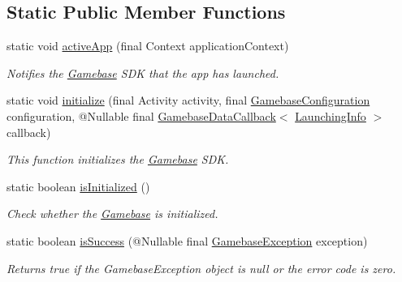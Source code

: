 \subsection*{Static Public Member Functions}
\begin{DoxyCompactItemize}
\item 
static void \hyperlink{classcom_1_1toast_1_1android_1_1gamebase_1_1_gamebase_a07fe4c62c585e8af9f924935e813ff12}{active\+App} (final Context application\+Context)
\begin{DoxyCompactList}\small\item\em Notifies the \hyperlink{classcom_1_1toast_1_1android_1_1gamebase_1_1_gamebase}{Gamebase} S\+DK that the app has launched. \end{DoxyCompactList}\item 
static void \hyperlink{classcom_1_1toast_1_1android_1_1gamebase_1_1_gamebase_a1b2d26183c219ab1ef840a95af71bd88}{initialize} (final Activity activity, final \hyperlink{classcom_1_1toast_1_1android_1_1gamebase_1_1_gamebase_configuration}{Gamebase\+Configuration} configuration, @Nullable final \hyperlink{interfacecom_1_1toast_1_1android_1_1gamebase_1_1_gamebase_data_callback}{Gamebase\+Data\+Callback}$<$ \hyperlink{classcom_1_1toast_1_1android_1_1gamebase_1_1launching_1_1data_1_1_launching_info}{Launching\+Info} $>$ callback)
\begin{DoxyCompactList}\small\item\em This function initializes the \hyperlink{classcom_1_1toast_1_1android_1_1gamebase_1_1_gamebase}{Gamebase} S\+DK. \end{DoxyCompactList}\item 
static boolean \hyperlink{classcom_1_1toast_1_1android_1_1gamebase_1_1_gamebase_a40e7b7b4c19a8bf4140aa22033ab6489}{is\+Initialized} ()
\begin{DoxyCompactList}\small\item\em Check whether the \hyperlink{classcom_1_1toast_1_1android_1_1gamebase_1_1_gamebase}{Gamebase} is initialized. \end{DoxyCompactList}\item 
static boolean \hyperlink{classcom_1_1toast_1_1android_1_1gamebase_1_1_gamebase_ae28caa0bc9c72de9cc018ee36eb25b47}{is\+Success} (@Nullable final \hyperlink{classcom_1_1toast_1_1android_1_1gamebase_1_1base_1_1_gamebase_exception}{Gamebase\+Exception} exception)
\begin{DoxyCompactList}\small\item\em Returns true if the Gamebase\+Exception object is null or the error code is zero. \end{DoxyCompactList}\item 

\end{DoxyCompactItemize}
